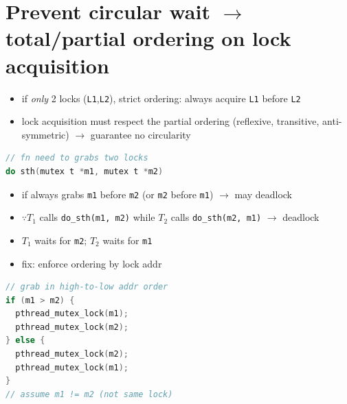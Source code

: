 \section*{Prevent circular wait $\to$ total/partial ordering on lock acquisition}
\begin{itemize}
\item if \emph{only} 2 locks (\texttt{L1},\texttt{L2}), strict ordering: always acquire \texttt{L1} before \texttt{L2}
\item lock acquisition must respect the partial ordering (reflexive, transitive, anti-symmetric) $\to$ guarantee no circularity
\end{itemize}
\begin{minipage}{0.5\linewidth}
\begin{lstlisting}[language=c,xleftmargin=2pt]
// fn need to grabs two locks
do sth(mutex t *m1, mutex t *m2)
\end{lstlisting}
  \begin{itemize}
  \item if always grabs \texttt{m1} before \texttt{m2} (or \texttt{m2} before \texttt{m1}) $\to$ may deadlock
  \item $\because T_1$ calls \texttt{do\_sth(m1, m2)} while $T_2$ calls \texttt{do\_sth(m2, m1)} $\to$ deadlock
  \item $T_1$ waits for \texttt{m2}; $T_2$ waits for \texttt{m1}
  \item fix: enforce ordering by lock addr
  \end{itemize}
\end{minipage}
\begin{minipage}{0.5\linewidth}
\begin{lstlisting}[language=c,xleftmargin=4pt,framextopmargin=1pt]
// grab in high-to-low addr order
if (m1 > m2) {
  pthread_mutex_lock(m1);
  pthread_mutex_lock(m2);
} else {
  pthread_mutex_lock(m2);
  pthread_mutex_lock(m1);
}
// assume m1 != m2 (not same lock)
\end{lstlisting}
\end{minipage}
